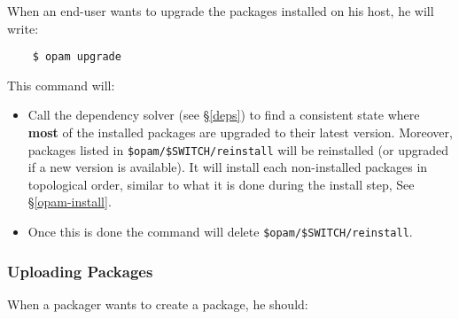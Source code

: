 \documentclass[a4paper,11pt]{article}
\begin{document}
When an end-user wants to upgrade the packages installed on his host,
he will write:

\begin{verbatim}
    $ opam upgrade
\end{verbatim}

This command will:

\begin{itemize}

\item Call the dependency solver (see \S\ref{deps}) to
find a consistent state where {\bf most} of the installed packages are
upgraded to their latest version. Moreover, packages listed in
\verb+$opam/$SWITCH/reinstall+ will be reinstalled (or upgraded if a new
version is available). It will install each non-installed packages in
topological order, similar to what it is done during the install step,
See \S\ref{opam-install}.

\item Once this is done the command will delete
  \verb+$opam/$SWITCH/reinstall+.

\end{itemize}

\subsubsection{Uploading Packages}
\label{opam-upload}

When a packager wants to create a package, he should:
\end{document}
